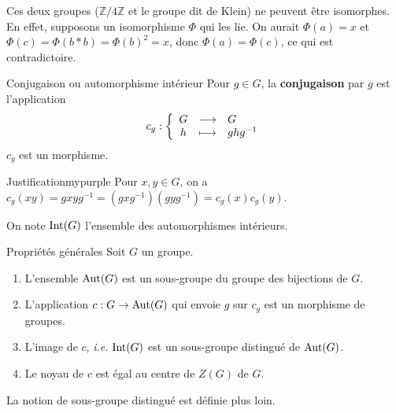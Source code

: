     Ces deux groupes ($\mathbb{Z} / 4 \mathbb{Z}$ et le groupe dit de Klein) ne peuvent être isomorphes. En effet, supposons un isomorphisme $\Phi$ qui les lie. On aurait $\Phi(a) = x$ et $\Phi(c) = \Phi(b * b) = \Phi(b)^2 = x$, donc $\Phi(a) = \Phi(c)$, ce qui est contradictoire.

    \begin{defitheo}{Conjugaison ou automorphisme intérieur}{}
        Pour $g \in G$, la \textbf{conjugaison} par $g$ est l’application 
        \[ \fonction{c_g}{G}{G}{h}{ghg^{-1}} \]   
        $c_g$ est un morphisme. 
    \end{defitheo}

    \begin{demo}{Justification}{mypurple}
        Pour $x,y \in G$, on a $c_g(xy) = g x y g^{-1} = (g x g^{-1}) (g y g^{-1}) = c_g(x) c_g(y)$. 
    \end{demo}

    On note $\operatorname{Int}(G)$ l’ensemble des automorphismes intérieurs. 

    \begin{prop}{Propriétés générales}{}
        Soit $G$ un groupe.
        \begin{enumerate}
            \item L’ensemble $\operatorname{Aut}(G)$ est un sous-groupe du groupe des bijections de $G$.
            \item L’application $c : G \to \operatorname{Aut}(G)$ qui envoie $g$ sur $c_g$ est un morphisme de groupes.
            \item L’image de $c$, \textit{i.e.} $\operatorname{Int}(G)$ est un sous-groupe distingué de $\operatorname{Aut}(G)$.
            \item Le noyau de $c$ est égal au centre de $Z(G)$ de $G$.
        \end{enumerate}
    \end{prop}

    La notion de sous-groupe distingué est définie plus loin.

